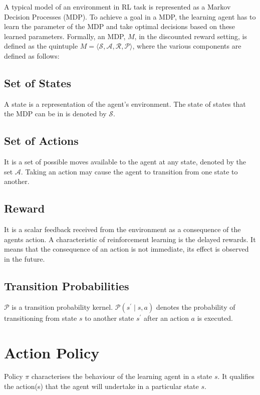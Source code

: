 A typical model of an environment in RL task is represented as a Markov Decision Processes (MDP).
To achieve a goal in a MDP, the learning agent has to learn the parameter of the MDP and take optimal decisions based on these learned parameters.
Formally, an MDP, $M$, in the discounted reward setting, is defined as the quintuple $M = \langle \mathcal{S}, \mathcal{A}, \mathcal{R}, \mathcal{P} \rangle$, where the various components are defined as follows:

\subsection{Set of States}

A state is a representation of the agent's environment.
The state of states that the MDP can be in is denoted by $\mathcal{S}$.

\subsection{Set of Actions}

It is a set of possible moves available to the agent at any state, denoted by the set $\mathcal{A}$.
Taking an action may cause the agent to transition from one state to another.

\subsection{Reward}

It is a scalar feedback received from the environment as a consequence of the agents action.
A characteristic of reinforcement learning is the delayed rewards.
It means that the consequence of an action is not immediate, its effect is observed in the future.

\subsection{Transition Probabilities}

$\mathcal{P}$ is a transition probability kernel.
$\mathcal{P}(s^\prime \mid s, a)$ denotes the probability of transitioning from state $s$ to another state $s^\prime$ after an action $a$ is executed.

\section{Action Policy}

Policy $\pi$ characterises the behaviour of the learning agent in a state $s$. 
It qualifies the action(s) that the agent will undertake in a particular state $s$.


